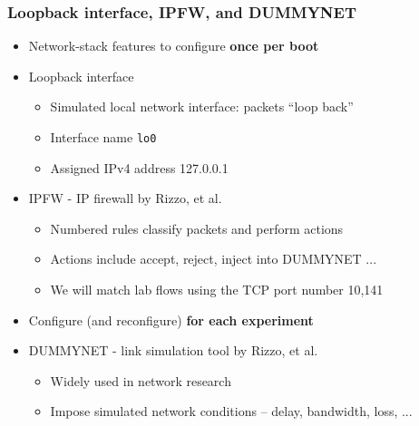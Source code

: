 \begin{frame}[fragile]
  \frametitle{Loopback interface, IPFW, and DUMMYNET}

  \begin{itemize}
    \item Network-stack features to configure \textbf{once per boot}

    \pause

    \item Loopback interface
    \begin{itemize}
      \item Simulated local network interface: packets ``loop back''
      \item Interface name \texttt{lo0}
      \item Assigned IPv4 address 127.0.0.1
    \end{itemize}

    \pause

    \item IPFW - IP firewall by Rizzo, et al.
    \begin{itemize}
      \item Numbered rules classify packets and perform actions
      \item Actions include accept, reject, inject into DUMMYNET ...
      \item We will match lab flows using the TCP port number 10,141
    \end{itemize}

    \medskip
    \pause

    \item Configure (and reconfigure) \textbf{for each experiment}
    \item DUMMYNET - link simulation tool by Rizzo, et al.
    \begin{itemize}
      \item Widely used in network research
      \item Impose simulated network conditions -- delay, bandwidth, loss, ...
    \end{itemize}
  \end{itemize}
\end{frame}

